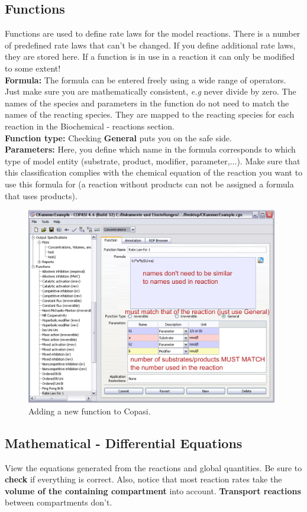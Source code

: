 \documentclass[a4paper,11pt,twoside]{article}
\begin{document}
\subsection{Functions}
\label{sub:funct}
Functions are used to define rate laws for the model reactions. There is a number of predefined rate laws that can't be changed. If you define additional rate laws, they are stored here. If a function is in use in a reaction it  can only be modified to some extent!\\
\textbf{Formula: }The formula can be entered freely using a wide range of operators. Just make sure you are mathematically consistent, \textit{e.g} never divide by zero. The names of the species and parameters in the function do not need to match the names of the reacting  species. They are mapped to the reacting species for each reaction in the Biochemical - reactions section.\\
\textbf{Function type:} Checking \textbf{General} puts you on the safe side.\\
\textbf{Parameters:} Here, you define which name in the formula corresponds to which type of model entity (substrate, product, modifier, parameter,...). Make sure that this classification  complies  with the chemical equation of the reaction you want to use this formula for (a reaction without products can not be assigned a formula that uses products).

\begin{figure}[htb]
 \centering
 \includegraphics[width=11cm]{Pictures/CopasiFunction21.pdf}
 \caption{\footnotesize Adding a new function to Copasi.}
 \label{fig:funct}
\end{figure}

\subsection{Mathematical - Differential Equations}
\label{sub:DiffEq}
View the equations generated from the reactions and global quantities. Be sure to \textbf{check} if everything is correct. Also, notice that most reaction rates take the \textbf{volume of the  containing compartment} into account. \textbf{Transport reactions} between compartments don't.
\end{document}

